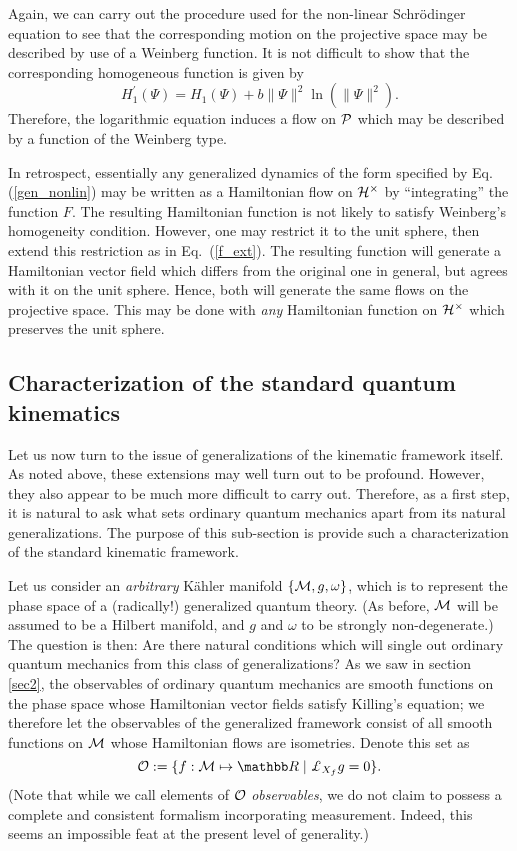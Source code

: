 \documentclass[12pt,aps,eqsecnum,tighten,nofootinbib]{revtex4-2}
\def\be{\begin{equation}}
\def\ee{\end{equation}}
\def\punctH{{\cal H}^{\times}}
\def\P{{\cal P}}
\def\M{{\cal M}}
\def\w{\omega}
\newcommand{\eqn}[1]{Eq.~(\ref{#1})}
\newcommand{\lie}[1]{{\pounds}_{#1}}
\newcommand{\hvf}[1]{{X_{#1}}}
\def\R{\mathbb R}
\begin{document}
Again, we can carry out the procedure used for the non-linear
Schr\"odinger equation to see that the corresponding motion on the
projective space may be described by use of a Weinberg function.  It
is not difficult to show that the corresponding homogeneous function
is given by
%
\be
 H_1^\prime(\Psi) = H_1(\Psi) + b\|\Psi\|^2 \ln( \| \Psi \|^2 ).
\ee
%
Therefore, the logarithmic equation induces a flow on $\P$ which may
be described by a function of the Weinberg type.

In retrospect, essentially any generalized dynamics of the form
specified by Eq. (\ref{gen_nonlin}) may be written as a Hamiltonian
flow on $\punctH$ by ``integrating'' the function $F$.  The resulting
Hamiltonian function is not likely to satisfy Weinberg's homogeneity
condition.  However, one may restrict it to the unit sphere, then
extend this restriction as in \eqn{f_ext}.  The resulting function
will generate a Hamiltonian vector field which differs from the
original one in general, but agrees with it on the unit sphere.
Hence, both will generate the same flows on the projective space.
This may be done with {\em any} Hamiltonian function on $\punctH$
which preserves the unit sphere.




\subsection{Characterization of the standard quantum kinematics}
\label{sec3.B}					

Let us now turn to the issue of generalizations of the kinematic
framework itself. As noted above, these extensions may well turn out
to be profound. However, they also appear to be much more difficult to
carry out. Therefore, as a first step, it is natural to ask what sets
ordinary quantum mechanics apart from its natural generalizations.
The purpose of this sub-section is provide such a characterization of
the standard kinematic framework.

Let us consider an {\em arbitrary} K\"ahler manifold $\{ \M, g, \w
\}$, which is to represent the phase space of a (radically!)
generalized quantum theory. (As before, $\M$ will be assumed to be a
Hilbert manifold, and $g$ and $\w$ to be strongly non-degenerate.)
The question is then: Are there natural conditions which
will single out ordinary quantum mechanics from this class of
generalizations?  As we saw in section \ref{sec2}, the observables of
ordinary quantum mechanics are smooth functions on the phase space
whose Hamiltonian vector fields satisfy Killing's equation; we
therefore let the observables of the generalized framework consist of
all smooth functions on $\M$ whose Hamiltonian flows are
isometries. Denote this set as
%
\be
  {\cal O} := \{ f: \M \mapsto \R \; | \; \lie{\hvf{f}} g = 0 \}.
\ee
%
(Note that while we call elements of ${\cal O}$ {\em observables},
we do not claim to possess a complete and consistent formalism
incorporating measurement. Indeed, this seems an impossible feat at
the present level of generality.)
\end{document}

